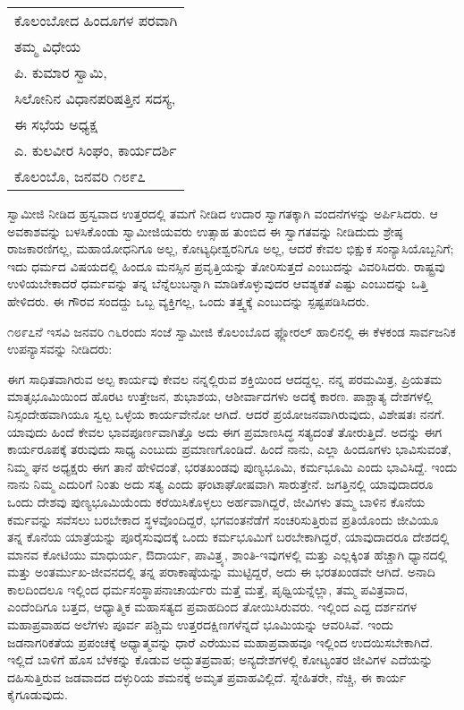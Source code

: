 \vskip 2pt

\begin{longtable}[r]{@{}l@{}}
ಕೊಲಂಬೋದ ಹಿಂದೂಗಳ ಪರವಾಗಿ \\
ತಮ್ಮ ವಿಧೇಯ \\
ಪಿ. ಕುಮಾರ ಸ್ವಾಮಿ, \\
ಸಿಲೋನಿನ ವಿಧಾನಪರಿಷತ್ತಿನ ಸದಸ್ಯ, \\
ಈ ಸಭೆಯ ಅಧ್ಯಕ್ಷ \\
ಎ. ಕುಲವೀರ ಸಿಂಘಂ, ಕಾರ್ಯದರ್ಶಿ \\
ಕೊಲಂಬೊ, ಜನವರಿ ೧೮೯೭ \\
\end{longtable}

\vskip 4pt

ಸ್ವಾಮೀಜಿ ನೀಡಿದ ಹ್ರಸ್ವವಾದ ಉತ್ತರದಲ್ಲಿ ತಮಗೆ ನೀಡಿದ ಉದಾರ ಸ್ವಾಗತಕ್ಕಾಗಿ ವಂದನೆಗಳನ್ನು ಅರ್ಪಿಸಿದರು. ಆ ಅವಕಾಶವನ್ನು ಬಳಸಿಕೊಂಡು ಸ್ವಾಮೀಜಿಯವರು ಉತ್ಸಾಹ ತುಂಬಿದ ಈ ಸ್ವಾಗತವನ್ನು ನೀಡಿದುದು ಶ್ರೇಷ್ಠ ರಾಜಕಾರಣಿಗಲ್ಲ, ಮಹಾಯೋಧನಿಗೂ ಅಲ್ಲ, ಕೋಟ್ಯಧೀಶ್ವರನಿಗೂ ಅಲ್ಲ, ಆದರೆ ಕೇವಲ ಭಿಕ್ಷುಕ ಸಂನ್ಯಾಸಿಯೊಬ್ಬನಿಗೆ; ಇದು ಧರ್ಮದ ವಿಷಯದಲ್ಲಿ ಹಿಂದೂ ಮನಸ್ಸಿನ ಪ್ರವೃತ್ತಿಯನ್ನು ತೋರಿಸುತ್ತದೆ ಎಂಬುದನ್ನು ವಿವರಿಸಿದರು. ರಾಷ್ಟ್ರವು ಉಳಿಯಬೇಕಾದರೆ ಧರ್ಮವನ್ನು ತನ್ನ ಬೆನ್ನೆಲುಬನ್ನಾಗಿ ಮಾಡಿಕೊಳ್ಳುವುದರ ಆವಶ್ಯಕತೆ ಎಷ್ಟು ಎಂಬುದನ್ನು ಒತ್ತಿ ಹೇಳಿದರು. ಈ ಗೌರವ ಸಂದದ್ದು ಒಬ್ಬ ವ್ಯಕ್ತಿಗಲ್ಲ, ಒಂದು ತತ್ತ್ವಕ್ಕೆ ಎಂಬುದನ್ನು ಸ್ಪಷ್ಟಪಡಿಸಿದರು.

೧೮೯೭ನೆ ಇಸವಿ ಜನವರಿ ೧೬ರಂದು ಸಂಜೆ ಸ್ವಾಮೀಜಿ ಕೊಲಂಬೊದ ಫ್ಲೋರಲ್​ ಹಾಲಿನಲ್ಲಿ ಈ ಕೆಳಕಂಡ ಸಾರ್ವಜನಿಕ ಉಪನ್ಯಾಸವನ್ನು ನೀಡಿದರು:

ಈಗ ಸಾಧಿತವಾಗಿರುವ ಅಲ್ಪ ಕಾರ್ಯವು ಕೇವಲ ನನ್ನಲ್ಲಿರುವ ಶಕ್ತಿಯಿಂದ ಆದದ್ದಲ್ಲ. ನನ್ನ ಪರಮಮಿತ್ರ, ಪ್ರಿಯತಮ ಮಾತೃಭೂಮಿಯಿಂದ ಹೊರಟ ಉತ್ತೇಜನ, ಶುಭಾಶಯ, ಆಶೀರ್ವಾದಗಳು ಅದಕ್ಕೆ ಕಾರಣ. ಪಾಶ್ಚಾತ್ಯ ದೇಶಗಳಲ್ಲಿ ನಿಸ್ಸಂದೇಹವಾಗಿಯೂ ಸ್ವಲ್ಪ ಒಳ್ಳೆಯ ಕಾರ್ಯವೇನೋ ಆಗಿದೆ. ಆದರೆ ಪ್ರಯೋಜನವಾಗಿರುವುದು, ವಿಶೇಷತಃ ನನಗೆ. ಯಾವುದು ಹಿಂದೆ ಕೇವಲ ಭಾವಪೂರ್ಣವಾಗಿತ್ತೊ ಅದು ಈಗ ಪ್ರಮಾಣಸಿದ್ಧ ಸತ್ಯದಂತೆ ತೋರುತ್ತಿದೆ. ಅದನ್ನು ಈಗ ಕಾರ್ಯರೂಪಕ್ಕೆ ತರುವುದು ಸಾಧ್ಯ ಎಂಬುದು ಪ್ರಮಾಣಗೊಂಡಿದೆ. ಹಿಂದೆ ನಾನು, ಎಲ್ಲಾ ಹಿಂದೂಗಳು ಭಾವಿಸುವಂತೆ, ನಿಮ್ಮ ಘನ ಅಧ್ಯಕ್ಷರು ಈಗ ತಾನೆ ಹೇಳಿದಂತೆ, ಭರತಖಂಡವು ಪುಣ್ಯಭೂಮಿ, ಕರ್ಮಭೂಮಿ ಎಂದು ಭಾವಿಸಿದ್ದೆ. ಇಂದು ನಾನು ನಿಮ್ಮ ಎದುರಿಗೆ ನಿಂತು ಅದು ಸತ್ಯ ಎಂದು ಘಂಟಾಘೋಷವಾಗಿ ಸಾರುತ್ತೇನೆ. ಜಗತ್ತಿನಲ್ಲಿ ಯಾವುದಾದರೂ ಒಂದು ದೇಶವು ಪುಣ್ಯಭೂಮಿಯೆಂದು ಕರೆಯಿಸಿಕೊಳ್ಳಲು ಅರ್ಹವಾಗಿದ್ದರೆ, ಜೀವಿಗಳು ತಮ್ಮ ಬಾಳಿನ ಕೊನೆಯ ಕರ್ಮವನ್ನು ಸವೆಸಲು ಬರಬೇಕಾದ ಸ್ಥಳವೊಂದಿದ್ದರೆ, ಭಗವಂತನೆಡೆಗೆ ಸಂಚರಿಸುತ್ತಿರುವ ಪ್ರತಿಯೊಂದು ಜೀವಿಯೂ ತನ್ನ ಕೊನೆಯ ಯಾತ್ರೆಯನ್ನು ಪೂರೈಸುವುದಕ್ಕೆ ಒಂದು ಕರ್ಮಭೂಮಿಗೆ ಬರಬೇಕಾಗಿದ್ದರೆ, ಯಾವುದಾದರೂ ದೇಶದಲ್ಲಿ ಮಾನವ ಕೋಟಿಯು ಮಾಧುರ್ಯ, ಔದಾರ್ಯ, ಪಾವಿತ್ರ್ಯ, ಶಾಂತಿ-ಇವುಗಳಲ್ಲಿ ಮತ್ತು ಎಲ್ಲಕ್ಕಿಂತ ಹೆಚ್ಚಾಗಿ ಧ್ಯಾನದಲ್ಲಿ ಮತ್ತು ಅಂತರ್ಮುಖ-ಜೀವನದಲ್ಲಿ ತನ್ನ ಪರಾಕಾಷ್ಠೆಯನ್ನು ಮುಟ್ಟಿದ್ದರೆ, ಅದು ಈ ಭರತಖಂಡವೇ ಆಗಿದೆ. ಅನಾದಿ ಕಾಲದಿಂದಲೂ ಇಲ್ಲಿಂದ ಧರ್ಮಸಂಸ್ಥಾಪನಾಚಾರ್ಯರು ಮತ್ತೆ ಮತ್ತೆ, ಪೃಥ್ವಿಯನ್ನೆಲ್ಲಾ, ತಮ್ಮ ಪವಿತ್ರವಾದ, ಎಂದೆಂದಿಗೂ ಬತ್ತದ, ಆಧ್ಯಾತ್ಮಿಕ ಮಹಾಸತ್ಯದ ಪ್ರವಾಹದಿಂದ ತೋಯಿಸಿರುವರು. ಇಲ್ಲಿಂದ ಎದ್ದ ದರ್ಶನಗಳ ಮಹಾಪ್ರವಾಹದ ಅಲೆಗಳು ಪೂರ್ವ ಪಶ್ಚಿಮ ಉತ್ತರ\break ದಕ್ಷಿಣಗಳೆನ್ನದೆ ಭೂಮಿಯನ್ನು ಆವರಿಸಿವೆ. ಇಂದು ಜಡನಾಗರಿಕತೆಯ ಪ್ರಪಂಚಕ್ಕೆ ಅಧ್ಯಾತ್ಮವನ್ನು ಧಾರೆ ಎರೆಯುವ ಮಹಾಪ್ರವಾಹವೂ ಇಲ್ಲಿಂದ ಉದಯಿಸಬೇಕಾಗಿದೆ. ಇಲ್ಲಿದೆ ಬಾಳಿಗೆ ಹೊಸ ಬೆಳಕನ್ನು ಕೊಡುವ ಅದ್ಭುತಪ್ರವಾಹ; ಅನ್ಯದೇಶಗಳಲ್ಲಿ ಕೋಟ್ಯಂತರ ಜೀವಿಗಳ ಎದೆಯನ್ನು ದಹಿಸುತ್ತಿರುವ ಜಡವಾದದ ದಳ್ಳುರಿಯ ಶಮನಕ್ಕೆ ಅಮೃತ ಪ್ರವಾಹವಿಲ್ಲಿದೆ. ಸ್ನೇಹಿತರೇ, ನೆಚ್ಚಿ, ಈ ಕಾರ್ಯ ಕೈಗೂಡುವುದು.

